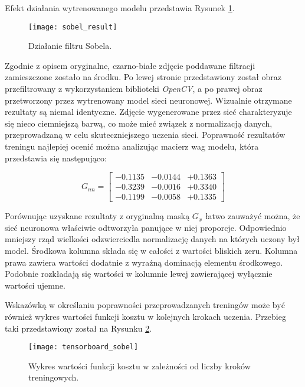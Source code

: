     Efekt działania wytrenowanego modelu przedstawia Rysunek \ref{fig:sobel_result}.

    \begin{figure}[h!]
      \centering
      \texttt{[image: sobel\_result]}
      \caption[Działanie filtru Sobela - źródło: Rysunek własny]{Działanie filtru Sobela.}
      \label{fig:sobel_result}
    \end{figure}

    Zgodnie z opisem oryginalne, czarno-białe zdjęcie poddawane filtracji zamieszczone
    zostało na środku. Po lewej stronie przedstawiony został obraz przefiltrowany
    z wykorzystaniem biblioteki \textit{OpenCV}, a po prawej obraz przetworzony przez
    wytrenowany model sieci neuronowej. Wizualnie otrzymane rezultaty są niemal
    identyczne. Zdjęcie wygenerowane przez sieć charakteryzuje się nieco ciemniejszą
    barwą, co może mieć związek z normalizacją danych, przeprowadzaną w celu skuteczniejszego
    uczenia sieci. Poprawność rezultatów treningu najlepiej ocenić można analizując
    macierz wag modelu, która przedstawia się następująco:

    \[G_{nn} =
    \begin{bmatrix}
    -0.1135 & -0.0144 & +0.1363 \\
    -0.3239 & -0.0016 & +0.3340 \\
    -0.1199 & -0.0058 & +0.1335
    \end{bmatrix}
    \]

    Porównując uzyskane rezultaty z oryginalną maską $G_x$ łatwo zauważyć można,
    że sieć neuronowa właściwie odtworzyła panujące w niej proporcje. Odpowiednio
    mniejszy rząd wielkości odzwierciedla normalizację danych na których uczony
    był model. Środkowa kolumna składa się w całości z wartości bliskich zeru.
    Kolumna prawa zawiera wartości dodatnie z wyraźną dominacją elementu środkowego.
    Podobnie rozkładają się wartości w kolumnie lewej zawierającej wyłącznie wartości
    ujemne.

    Wskazówką w określaniu poprawności przeprowadzanych treningów może być również
    wykres wartości funkcji kosztu w kolejnych krokach uczenia. Przebieg taki
    przedstawiony został na Rysunku \ref{fig:tensorboard_sobel}.

    \begin{figure}[h!]
      \centering
      \texttt{[image: tensorboard\_sobel]}
      \caption[Wykres wartości funkcji kosztu w zależności od liczby kroków treningowych - źródło: Rysunek własny]{Wykres wartości funkcji kosztu w zależności od liczby kroków treningowych.}
      \label{fig:tensorboard_sobel}
    \end{figure}

